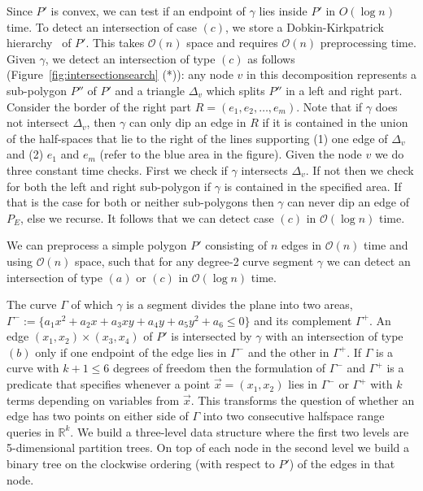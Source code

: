 \documentclass[UKenglish]{lipics-v2019}
\newcommand{\mkmcal}[1]{\ensuremath{\mathcal{#1}}\xspace}
\renewcommand{\O}{\mkmcal{O}}
\begin{document}
Since $P'$ is convex, we can
test if an endpoint of $\gamma$ lies inside $P'$ in $O(\log n)$ time. To
detect an intersection of case $(c)$, we store a Dobkin-Kirkpatrick hierarchy~\cite{dobkin1983intersection} of $P'$. This takes $\O(n)$ space
and requires $\O(n)$ preprocessing time. Given $\gamma$, we detect an intersection of type $(c)$ as follows (Figure~\ref{fig:intersectionsearch} (*)):
any node $v$ in this decomposition represents a sub-polygon $P''$ of $P'$ and a
triangle $\Delta_v$ which splits $P''$ in a left and right part. Consider the
border of the right part $R = (e_1, e_2, \ldots, e_m)$. Note that if $\gamma$
does not intersect $\Delta_v$, then $\gamma$ can only dip an edge in $R$ if it
is contained in the union of the half-spaces that lie to the right of the lines
supporting (1) one edge of $\Delta_v$ and (2) $e_1$ and $e_m$ (refer to the
blue area in the figure). Given the node $v$ we do three constant
time checks. First we check if $\gamma$ intersects $\Delta_v$. If not then we
check for both the left and right sub-polygon if $\gamma$ is contained in the
specified area. If that is the case for both or neither sub-polygons then
$\gamma$ can never dip an edge of $P_E$, else we recurse. It follows that we
can detect case $(c)$ in $\mathcal{O}(\log n)$ time. 
\begin{lemma}
  We can preprocess a simple polygon $P'$ consisting of $n$ edges in $\mathcal{O}(n)$ time and using $\mathcal{O}(n)$ space, such that for any degree-2 curve segment $\gamma$ we can detect an intersection of type $(a)$ or $(c)$ in $\mathcal{O}(\log n)$ time.
\end{lemma}


The curve $\Gamma$ of which $\gamma$ is a segment divides the plane into two areas, $\Gamma^- := \{ a_1 x^2 + a_2 x + a_3 xy + a_4 y + a_5 y^2 + a_6 \le 0  \}$ and its complement $\Gamma^+$. An edge $(x_1, x_2) \times (x_3, x_4)$ of $P'$ is intersected by $\gamma$ with an intersection of type $(b)$ only if one endpoint of the edge lies in $\Gamma^-$ and the other in $\Gamma^+$. If $\Gamma$ is a curve with $k+1 \le 6$ degrees of freedom then the formulation of $\Gamma^-$ and $\Gamma^+$ is a predicate that specifies whenever a point $\vec{x} = (x_1, x_2)$ lies in $\Gamma^-$ or $\Gamma^+$ with $k$ terms depending on variables from $\vec{x}$. This transforms the question of whether an edge has two points on either side of $\Gamma$ into two consecutive halfspace range queries in $\mathbb{R}^k$. 
We build a three-level data structure where the first two levels are
5-dimensional partition trees. On top of each node in the second level
we build a binary tree on the clockwise ordering (with respect to $P'$) of the edges in that node. 
\end{document}
